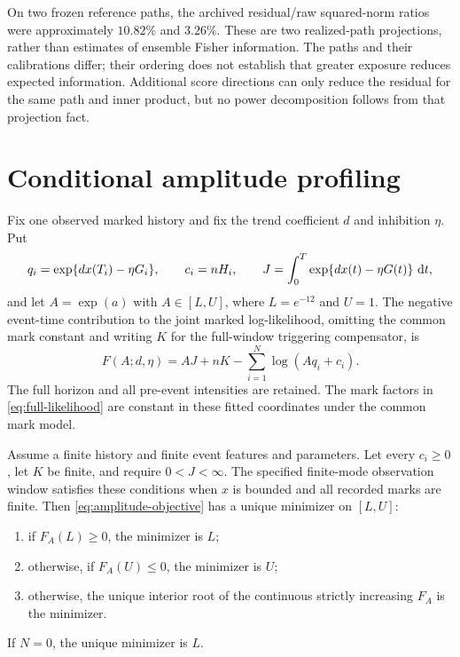 On two frozen reference paths, the archived residual/raw squared-norm ratios were approximately \(10.82\%\) and \(3.26\%\). These are two realized-path projections, rather than estimates of ensemble Fisher information. The paths and their calibrations differ; their ordering does not establish that greater exposure reduces expected information. Additional score directions can only reduce the residual for the same path and inner product, but no power decomposition follows from that projection fact.

\section{Conditional amplitude profiling}

Fix one observed marked history and fix the trend coefficient \(d\) and inhibition \(\eta\). Put
\[
q_i=\exp\{d x(T_i)-\eta G_i\},
\qquad
c_i=nH_i,
\qquad
J=\int_0^T\exp\{d x(t)-\eta G(t)\}\,\mathop{}\!\mathrm{d} t,
\]
and let \(A=\exp(a)\) with \(A\in[L,U]\), where \(L=e^{-12}\) and \(U=1\). The negative event-time contribution to the joint marked log-likelihood, omitting the common mark constant and writing \(K\) for the full-window triggering compensator, is
\begin{equation}
F(A;d,\eta)=AJ+nK-\sum_{i=1}^{N}\log(Aq_i+c_i).
\label{eq:amplitude-objective}
\end{equation}
The full horizon and all pre-event intensities are retained. The mark factors in \eqref{eq:full-likelihood} are constant in these fitted coordinates under the common mark model.

\begin{proposition}
\label{prop:amplitude}
Assume a finite history and finite event features and parameters. Let every \(c_i\ge0\), let \(K\) be finite, and require \(0<J<\infty\). The specified finite-mode observation window satisfies these conditions when \(x\) is bounded and all recorded marks are finite. Then \eqref{eq:amplitude-objective} has a unique minimizer on \([L,U]\):
\begin{enumerate}
\item if \(F_A(L)\ge0\), the minimizer is \(L\);
\item otherwise, if \(F_A(U)\le0\), the minimizer is \(U\);
\item otherwise, the unique interior root of the continuous strictly increasing \(F_A\) is the minimizer.
\end{enumerate}
If \(N=0\), the unique minimizer is \(L\).
\end{proposition}

